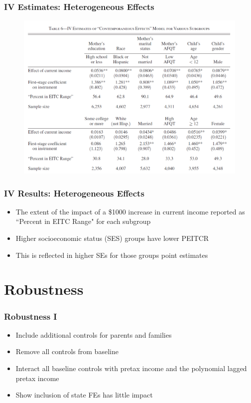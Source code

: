 \documentclass{beamer}
\begin{document}
\begin{frame}
\frametitle{IV Estimates: Heterogeneous Effects}
\begin{figure}
	\includegraphics[scale=0.3]{../Tables/table5.png} %
\end{figure}
\end{frame}

\begin{frame}
\frametitle{IV Results: Heterogeneous Effects}
\begin{itemize}
	\item The extent of the impact of a \$1000 increase in current income reported as ``Percent in EITC Range" for each subgroup
	\item Higher socioeconomic status (SES) groups have lower PEITCR
	\item This is reflected in higher SEs for those groups point estimates
\end{itemize}
\end{frame}


\section{Robustness}


\begin{frame}
\frametitle{Robustness I}
\begin{itemize}
	\item Include additional controls for parents and families
	\item Remove all controls from baseline
	\item Interact all baseline controls with pretax income and the polynomial lagged pretax income
	\item Show inclusion of state FEs has little impact
\end{itemize}
\end{frame}
\end{document}
